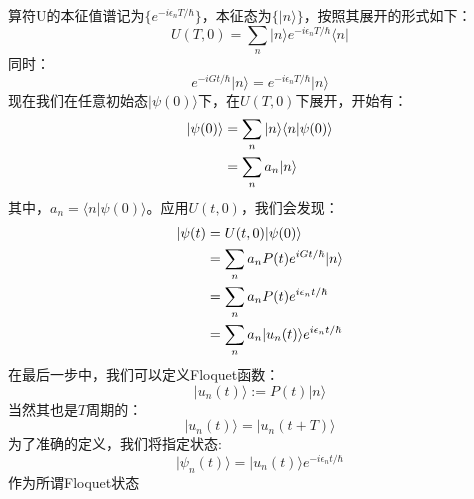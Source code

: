 \documentclass{article}
\begin{document}
	算符U的本征值谱记为$\{e^{-i\epsilon_nT/\hbar}\}$，本征态为$\{\vert n\rangle\}$，按照其展开的形式如下：
	\begin{equation}
		U(T,0)=\sum_n \vert n \rangle e^{-i\epsilon_nT/\hbar} \langle n \vert
	\end{equation}
	同时：
	\begin{equation}
		e^{-iGt/\hbar}\vert n \rangle = e^{-i\epsilon_nT/\hbar}\vert n \rangle
	\end{equation}
	现在我们在任意初始态$\vert \psi(0) \rangle$下，在$U(T,0)$下展开，开始有：
	\begin{align}
		\vert \psi(0) \rangle&=\sum_n \vert n\rangle \langle n \vert\psi(0)\rangle \notag \\
		&=\sum_na_n\vert n\rangle
	\end{align}
	其中，$a_n=\langle n \vert\psi(0)\rangle$。应用$U(t,0)$，我们会发现：
	\begin{align}
		\vert\psi(t)&=U(t,0)\vert\psi(0)\rangle \notag \\
		&=\sum_n a_nP(t)e^{iGt/\hbar}\vert n\rangle \notag \\
		&=\sum_n a_nP(t)e^{i\epsilon_nt/\hbar} \notag \\
		&=\sum_n a_n\vert u_n(t)\rangle e^{i\epsilon_nt/\hbar}
	\end{align}
	在最后一步中，我们可以定义Floquet函数：
	\begin{equation}
		\vert u_n(t)\rangle:=P(t)\vert n \rangle
	\end{equation}
	当然其也是$T$周期的：
	\begin{equation}
		\vert u_n(t) \rangle = \vert u_n (t+T) \rangle
	\end{equation}
	为了准确的定义，我们将指定状态:
	\begin{equation}
		\vert \psi_n(t) \rangle=\vert u_n(t)\rangle e^{-i\epsilon_nt/\hbar}
	\end{equation}
	作为所谓Floquet状态
\end{document}
